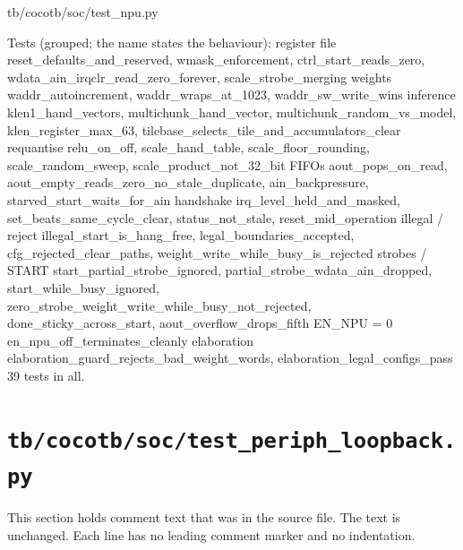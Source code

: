 \begin{relocated}{tb/cocotb/soc/test_npu.py}
\begin{textblock}
Tests (grouped; the name states the behaviour):
register file   reset_defaults_and_reserved, wmask_enforcement, ctrl_start_reads_zero,
wdata_ain_irqclr_read_zero_forever, scale_strobe_merging
weights         waddr_autoincrement, waddr_wraps_at_1023, waddr_sw_write_wins
inference       klen1_hand_vectors, multichunk_hand_vector, multichunk_random_vs_model,
klen_register_max_63, tilebase_selects_tile_and_accumulators_clear
requantise      relu_on_off, scale_hand_table, scale_floor_rounding, scale_random_sweep,
scale_product_not_32_bit
FIFOs           aout_pops_on_read, aout_empty_reads_zero_no_stale_duplicate, ain_backpressure,
starved_start_waits_for_ain
handshake       irq_level_held_and_masked, set_beats_same_cycle_clear, status_not_stale,
reset_mid_operation
illegal / reject illegal_start_is_hang_free, legal_boundaries_accepted, cfg_rejected_clear_paths,
weight_write_while_busy_is_rejected
strobes / START start_partial_strobe_ignored, partial_strobe_wdata_ain_dropped,
start_while_busy_ignored, zero_strobe_weight_write_while_busy_not_rejected,
done_sticky_across_start, aout_overflow_drops_fifth
EN_NPU = 0      en_npu_off_terminates_cleanly
elaboration     elaboration_guard_rejects_bad_weight_words, elaboration_legal_configs_pass
39 tests in all.
\end{textblock}

\end{relocated}

\section{\texttt{tb/cocotb/soc/test\_periph\_loopback.py}}\label{tm:suite:soc-test-periph-loopback}

This section holds comment text that was in the source file. The text is unchanged. Each line has no leading comment marker and no indentation.

